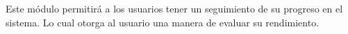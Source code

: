 Este módulo permitirá a los usuarios tener un seguimiento de su progreso en el sistema. 
Lo cual otorga al usuario una manera de evaluar su rendimiento.


% 




%


